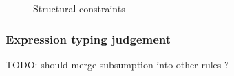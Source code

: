 \documentclass[preprint,nocopyrightspace,9pt]{sigplanconf}
\begin{document}
\begin{figure}



\caption{Structural constraints}
\label{fig:structural}
\end{figure}

\subsubsection{
        Expression typing judgement
}

TODO: should merge subsumption into other rules ?
\end{document}
